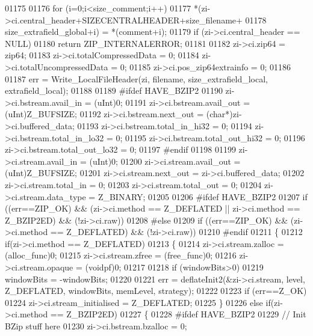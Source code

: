 \begin{DoxyCode}
01175 
01176     \textcolor{keywordflow}{for} (i=0;i<size\_comment;i++)
01177         *(zi->ci.central\_header+SIZECENTRALHEADER+size\_filename+
01178               size\_extrafield\_global+i) = *(comment+i);
01179     \textcolor{keywordflow}{if} (zi->ci.central\_header == NULL)
01180         \textcolor{keywordflow}{return} ZIP\_INTERNALERROR;
01181 
01182     zi->ci.zip64 = zip64;
01183     zi->ci.totalCompressedData = 0;
01184     zi->ci.totalUncompressedData = 0;
01185     zi->ci.pos\_zip64extrainfo = 0;
01186 
01187     err = Write\_LocalFileHeader(zi, filename, size\_extrafield\_local, extrafield\_local);
01188 
01189 \textcolor{preprocessor}{#ifdef HAVE\_BZIP2}
01190     zi->ci.bstream.avail\_in = (uInt)0;
01191     zi->ci.bstream.avail\_out = (uInt)Z\_BUFSIZE;
01192     zi->ci.bstream.next\_out = (\textcolor{keywordtype}{char}*)zi->ci.buffered\_data;
01193     zi->ci.bstream.total\_in\_hi32 = 0;
01194     zi->ci.bstream.total\_in\_lo32 = 0;
01195     zi->ci.bstream.total\_out\_hi32 = 0;
01196     zi->ci.bstream.total\_out\_lo32 = 0;
01197 #endif
01198 
01199     zi->ci.stream.avail\_in = (uInt)0;
01200     zi->ci.stream.avail\_out = (uInt)Z\_BUFSIZE;
01201     zi->ci.stream.next\_out = zi->ci.buffered\_data;
01202     zi->ci.stream.total\_in = 0;
01203     zi->ci.stream.total\_out = 0;
01204     zi->ci.stream.data\_type = Z\_BINARY;
01205 
01206 \textcolor{preprocessor}{#ifdef HAVE\_BZIP2}
01207     \textcolor{keywordflow}{if} ((err==ZIP\_OK) && (zi->ci.method == Z\_DEFLATED || zi->ci.method == Z\_BZIP2ED) && (!zi->ci.raw))
01208 #\textcolor{keywordflow}{else}
01209     \textcolor{keywordflow}{if} ((err==ZIP\_OK) && (zi->ci.method == Z\_DEFLATED) && (!zi->ci.raw))
01210 #endif
01211     \{
01212         \textcolor{keywordflow}{if}(zi->ci.method == Z\_DEFLATED)
01213         \{
01214           zi->ci.stream.zalloc = (alloc\_func)0;
01215           zi->ci.stream.zfree = (free\_func)0;
01216           zi->ci.stream.opaque = (voidpf)0;
01217 
01218           \textcolor{keywordflow}{if} (windowBits>0)
01219               windowBits = -windowBits;
01220 
01221           err = deflateInit2(&zi->ci.stream, level, Z\_DEFLATED, windowBits, memLevel, strategy);
01222 
01223           \textcolor{keywordflow}{if} (err==Z\_OK)
01224               zi->ci.stream\_initialised = Z\_DEFLATED;
01225         \}
01226         \textcolor{keywordflow}{else} \textcolor{keywordflow}{if}(zi->ci.method == Z\_BZIP2ED)
01227         \{
01228 \textcolor{preprocessor}{#ifdef HAVE\_BZIP2}
01229             \textcolor{comment}{// Init BZip stuff here}
01230           zi->ci.bstream.bzalloc = 0;

\end{DoxyCode}
